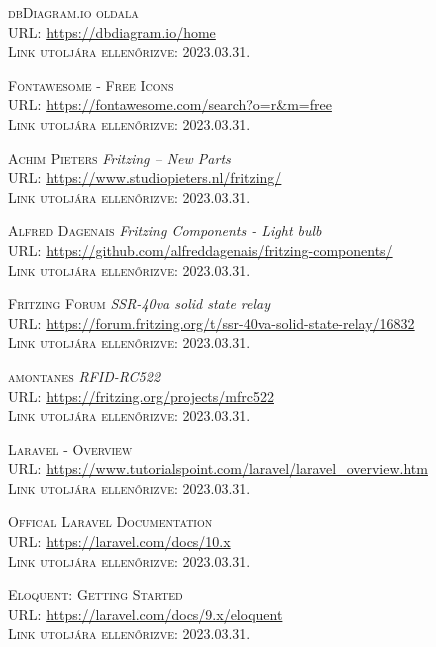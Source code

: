 \documentclass[
]{thesis-ekf}
\theoremstyle{definition}
\theoremstyle{remark}
\begin{document}
\begin{thebibliography}{20}
		\textsc{dbDiagram.io oldala}\\
		\textsc{URL:} \url{https://dbdiagram.io/home}\\
		\textsc{Link utoljára ellenőrizve:} 2023.03.31.
		
		\textsc{Fontawesome - Free Icons}\\
		\textsc{URL:} \url{https://fontawesome.com/search?o=r&m=free}\\
		\textsc{Link utoljára ellenőrizve:} 2023.03.31.
		
		\textsc{Achim Pieters} \emph{Fritzing – New Parts}\\
		\textsc{URL:} \url{https://www.studiopieters.nl/fritzing/}\\
		\textsc{Link utoljára ellenőrizve:} 2023.03.31.
		
		\textsc{Alfred Dagenais} \emph{Fritzing Components - Light bulb}\\
		\textsc{URL:} \url{https://github.com/alfreddagenais/fritzing-components/}\\
		\textsc{Link utoljára ellenőrizve:} 2023.03.31.
		
		\textsc{Fritzing Forum} \emph{SSR-40va solid state relay}\\
		\textsc{URL:} \url{https://forum.fritzing.org/t/ssr-40va-solid-state-relay/16832}\\
		\textsc{Link utoljára ellenőrizve:} 2023.03.31.
		
		\textsc{amontanes} \emph{RFID-RC522}\\
		\textsc{URL:} \url{https://fritzing.org/projects/mfrc522}\\
		\textsc{Link utoljára ellenőrizve:} 2023.03.31.
		
		\textsc{Laravel - Overview}\\
		\textsc{URL:} \url{https://www.tutorialspoint.com/laravel/laravel_overview.htm}\\
		\textsc{Link utoljára ellenőrizve:} 2023.03.31.
		
		\textsc{Offical Laravel Documentation}\\
		\textsc{URL:} \url{https://laravel.com/docs/10.x}\\
		\textsc{Link utoljára ellenőrizve:} 2023.03.31.
		
		\textsc{Eloquent: Getting Started}\\
		\textsc{URL:} \url{https://laravel.com/docs/9.x/eloquent}\\
		\textsc{Link utoljára ellenőrizve:} 2023.03.31.
		

\end{thebibliography}
\end{document}
